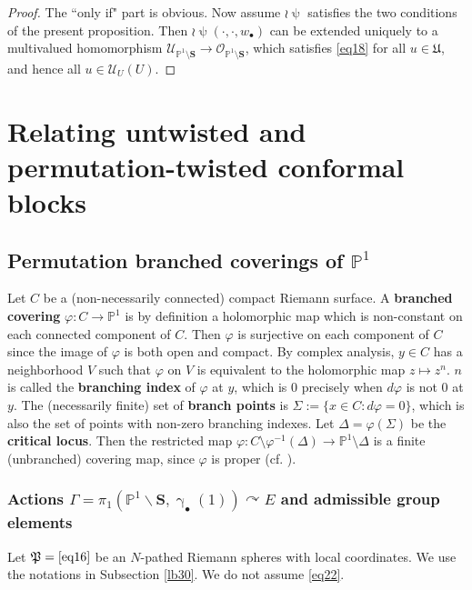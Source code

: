 \documentclass[12pt,a4paper,notitlepage]{article}
\theoremstyle{definition}
\theoremstyle{plain}
\newcommand{\fk}{\mathfrak}
\newcommand{\scr}{\mathscr}
\newcommand{\blt}{\bullet}
\newcommand{\Pbb}{\mathbb P}
\newcommand{\Sbf}{\mathbf{S}}
\numberwithin{equation}{subsection}
\begin{document}
\begin{proof}
The ``only if" part is obvious. Now assume $\wr\uppsi$ satisfies the two conditions of the present proposition. Then  $\wr\uppsi(\cdot,\cdot,w_\blt)$ can be extended uniquely to a multivalued homomorphism $\scr U_{\Pbb^1\setminus\Sbf}\rightarrow\scr O_{\Pbb^1\setminus\Sbf}$, which satisfies \eqref{eq18} for all $u\in\fk U$, and hence all $u\in\scr U_U(U)$.
\end{proof}






\section{Relating untwisted and permutation-twisted conformal blocks}



\subsection{Permutation branched coverings of $\Pbb^1$}

Let $C$ be a (non-necessarily connected) compact Riemann surface. A \textbf{branched covering} $\varphi:C\rightarrow\Pbb^1$ is by definition a holomorphic map which is non-constant on each connected component of $C$. Then $\varphi$ is surjective on each component of $C$ since the image of $\varphi$ is both open and compact. By complex analysis, $y\in C$ has a neighborhood $V$ such that $\varphi$ on $V$ is equivalent to the holomorphic map $z\mapsto z^n$. $n$ is called the \textbf{branching index} of $\varphi$ at $y$, which is $0$ precisely when $d\varphi$ is not $0$ at $y$. The (necessarily finite) set of  \textbf{branch points} is $\Sigma:=\{x\in C:d\varphi=0\}$, which is also the set of points with non-zero branching indexes. Let $\Delta=\varphi(\Sigma)$ be the \textbf{critical locus}. Then the restricted map $\varphi:C\setminus\varphi^{-1}(\Delta)\rightarrow\Pbb^1\setminus\Delta$ is a finite (unbranched) covering map, since $\varphi$ is proper (cf. \cite[Sec. 4.2.1]{Don}). 



\subsubsection{Actions  $\Gamma=\pi_1(\Pbb^1\backslash\Sbf,\upgamma_\blt(1))\curvearrowright E$ and admissible group elements}\label{lb52}

Let $\fk P=\eqref{eq16}$ be an $N$-pathed Riemann spheres with local coordinates. We use the notations in Subsection \ref{lb30}. We do not assume \eqref{eq22}.
\end{document}
